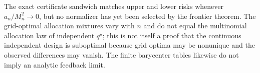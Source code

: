 The exact certificate sandwich matches upper and lower risks whenever \(a_n/M_n^2\to0\), but no normalizer has yet been selected by the frontier theorem.  The grid-optimal allocation mixtures vary with \(n\) and do not equal the multinomial allocation law of independent \(q^\star\); this is not itself a proof that the continuous independent design is suboptimal because grid optima may be nonunique and the observed differences may vanish.  The finite barycenter tables likewise do not imply an analytic feedback limit.